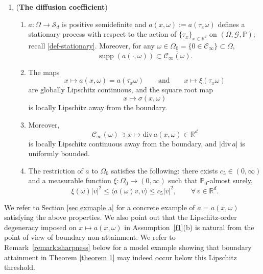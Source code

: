 \documentclass[11pt]{article}
\newcommand{\supp}{\mathop{\mathrm{supp}}}
\newcommand{\R}{\mathbb R}
\renewcommand{\P}{\mathbb P}
\theoremstyle{rem}
\begin{document}
\begin{enumerate}[label=\textbf{(A\arabic*)}]
\itemsep0.2em

\item \label{f1} ({\bf The diffusion coefficient})
\begin{enumerate}

\item
$a:\Omega\to\mathcal S_d$ is positive semidefinite and
$a(x,\omega):=a(\tau_x\omega)$ defines a stationary process with respect to the action of $\{\tau_x\}_{x\in\R^d}$ on $(\Omega,\mathcal G,\P)$; recall \eqref{def-stationary}. Moreover, for any $\omega\in\Omega_0=\{0\in\mathcal C_\infty\}\subset\Omega$,
\[
\supp(a(\cdot,\omega))
\subset
\overline{\mathcal C_\infty(\omega)}.
\]

\item
The maps
\[
x\mapsto a(x,\omega)=a(\tau_x\omega)
\qquad\mbox{and}\qquad
x\mapsto \xi(\tau_x\omega)
\]
are globally Lipschitz continuous, and the square root map
\[
x\mapsto \sigma(x,\omega)
\]
is locally Lipschitz away from the boundary.

\item
Moreover,
\[
\mathcal C_\infty(\omega)\ni x
\mapsto
\mathrm{div}\, a(x,\omega)\in\R^d
\]
is locally Lipschitz continuous away from the boundary, and
$|\mathrm{div}\,a|$ is uniformly bounded. 

\item
The restriction of $a$ to $\Omega_0$ satisfies the following: there exists
$c_5\in(0,\infty)$ and a measurable function
$\xi:\Omega_0\to(0,\infty)$ such that $\P_0$-almost surely,
\begin{equation}\label{eq:ellip-bounds}
\xi(\omega)|v|^2
\leq
\langle a(\omega)v,v\rangle
\leq
c_5|v|^2,
\qquad
\forall\, v\in\R^d.
\end{equation}

\end{enumerate}

\end{enumerate}

We refer to Section \ref{sec exmaple a} for a concrete example of
$a=a(x,\omega)$ satisfying the above properties. We also point out that the Lipschitz-order degeneracy imposed on $x\mapsto a(x,\omega)$ in Assumption~\ref{f1}(b) is natural from the point of view of boundary non-attainment. We refer to Remark~\ref{remark:sharpness} below for a model example showing that boundary attainment in Theorem \ref{theorem 1} may indeed occur below this Lipschitz threshold.
\end{document}
